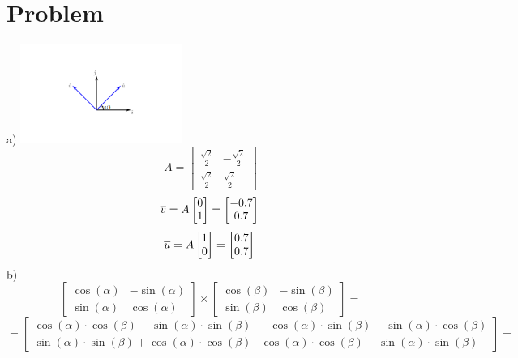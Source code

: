 \documentclass[11pt]{article}
\begin{document}
    \section{Problem}
    a)
    \includegraphics[width=200px]{coord1.png}
    \[ A=\begin{bmatrix}
            \frac{\sqrt{2}}{2} & -\frac{\sqrt{2}}{2} \\
            \frac{\sqrt{2}}{2} & \frac{\sqrt{2}}{2}
    \end{bmatrix} \]
    \[ \overline{v}=A \begin{bmatrix}
                       0\\
                       1
    \end{bmatrix} = \begin{bmatrix}
                        -0.7\\
                        0.7
    \end{bmatrix} \newline \]
    \[\overline{u}=A \begin{bmatrix}
                       1\\
                       0
    \end{bmatrix} = \begin{bmatrix}
                        0.7\\
                        0.7
    \end{bmatrix} \newline\]
    b)
    \[ \begin{bmatrix}
        \cos(\alpha) & -\sin(\alpha)\\
        \sin(\alpha) & \cos(\alpha)
    \end{bmatrix} \times \begin{bmatrix}
                             \cos(\beta) & -\sin(\beta)\\
                             \sin(\beta) & \cos(\beta)
    \end{bmatrix} = \]
    \[ = \begin{bmatrix}
                        \cos(\alpha)\cdot\cos(\beta)-\sin(\alpha)\cdot\sin(\beta) & -\cos(\alpha)\cdot\sin(\beta)-\sin(\alpha)\cdot\cos(\beta)\\
                        \sin(\alpha)\cdot\sin(\beta)+\cos(\alpha)\cdot\cos(\beta) & \cos(\alpha)\cdot\cos(\beta)-\sin(\alpha)\cdot\sin(\beta)
    \end{bmatrix} = \]
\end{document}
